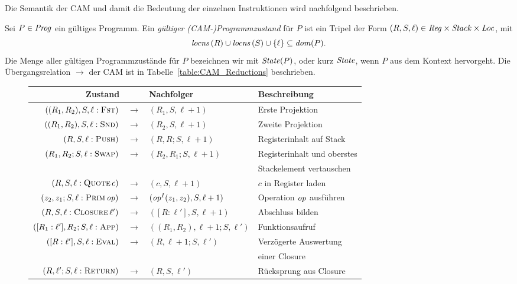 \documentclass[12pt,fleqn]{article}
\begin{document}
Die Semantik der CAM und damit die Bedeutung der einzelnen Instruktionen wird nachfolgend beschrieben.

\begin{definition}
  Sei $P\in{\text{\it Prog\/}}$ ein g\"ultiges Programm. Ein {\em g\"ultiger (CAM-)Programmzustand} f\"ur $P$ ist ein Tripel der Form
  $(R,S,\ell) \in {\text{\it Reg\/}} \times {\text{\it Stack\/}} \times {\text{\it Loc\/}}$, mit
  \[
  {\text{\it locns\/}}\,(R)\cup{\text{\it locns\/}}\,(S)\cup\{\ell\}\subseteq{\text{\it dom\/}}(P).
  \]
  Die Menge aller g\"ultigen Programmzust\"ande f\"ur $P$ bezeichnen wir mit ${\text{\it State\/}}(P)$, oder kurz ${\text{\it State\/}}$,
  wenn $P$ aus dem Kontext hervorgeht. Die \"Ubergangsrelation $\to$ der CAM ist in 
  Tabelle~\ref{table:CAM_Reductions} beschrieben.
\end{definition}

\begin{figure}
  {\footnotesize
  \begin{center}
    \begin{tabular}{|rcl|l|}
      \hline
      Zustand \hfill \quad && Nachfolger & Beschreibung \\
      \hline
      $((R_1,R_2),S,\ell:\textsc{Fst})$ & $\to$ & $(R_1,S,\ell+1)$ & Erste Projektion \\
      $((R_1,R_2),S,\ell:\textsc{Snd})$ & $\to$ & $(R_2,S,\ell+1)$ & Zweite Projektion \\
      \hline
      $(R,S,\ell:\textsc{Push})$ & $\to$ & $(R,R;S,\ell+1)$ & Registerinhalt auf Stack \\
      $(R_1,R_2;S,\ell:\textsc{Swap})$ & $\to$ & $(R_2,R_1;S,\ell+1)$ & Registerinhalt und oberstes \\
      &&& Stackelement vertauschen \\
      \hline
      $(R,S,\ell:\textsc{Quote}\,c)$ & $\to$ & $(c,S,\ell+1)$ & $c$ in Register laden \\
      $(z_2,z_1;S,\ell:\textsc{Prim}\,{\text{\it op\/}})$ & $\to$ & $({\text{\it op\/}}^I(z_1,z_2),S,\ell+1)$ & Operation ${\text{\it op\/}}$ ausf\"uhren \\
      $(R,S,\ell:\textsc{Closure}\,\ell')$ & $\to$ & $([R:\ell'],S,\ell+1)$ & Abschluss bilden \\
      \hline
      $([R_1:\ell'],R_2;S,\ell:\textsc{App})$ & $\to$ & $((R_1,R_2),\ell+1;S,\ell')$ & Funktionsaufruf \\
      $([R:\ell'],S,\ell:\textsc{Eval})$ & $\to$ & $(R,\ell+1;S,\ell')$ & Verz\"ogerte Auswertung \\
      &&& einer Closure \\
      $(R,\ell';S,\ell:\textsc{Return})$ & $\to$ & $(R,S,\ell')$ & R\"ucksprung aus Closure \\

\end{tabular}
\end{center}}
\end{figure}
\end{document}
